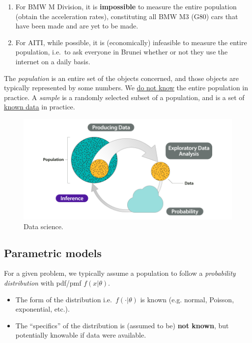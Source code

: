 \documentclass[
]{book}
\theoremstyle{definition}
\theoremstyle{definition}
\theoremstyle{definition}
\theoremstyle{definition}
\theoremstyle{remark}
\begin{document}
\begin{enumerate}
\def\labelenumi{\arabic{enumi}.}
\item
  For BMW M Division, it is \textbf{impossible} to measure the entire population (obtain the acceleration rates), constituting all BMW M3 (G80) cars that have been made and are yet to be made.
\item
  For AITI, while possible, it is (economically) infeasible to measure the entire population, i.e.~to ask everyone in Brunei whether or not they use the internet on a daily basis.
\end{enumerate}

The \emph{population} is an entire set of the objects concerned, and those objects are typically represented by some numbers. We \uline{do not know} the entire population in practice.
A \emph{sample} is a randomly selected subset of a population, and is a set of \uline{known data} in practice.

\begin{figure}

{\centering \includegraphics[width=0.6\linewidth]{figure/00-popsample} 

}

\caption{Data science.}\label{fig:popsample}
\end{figure}

\hypertarget{parametric-models}{%
\subsection*{Parametric models}\label{parametric-models}}

For a given problem, we typically assume a population
to follow a \emph{probability distribution} with pdf/pmf \(f(x|\theta)\).

\begin{itemize}
\item
  The form of the distribution i.e.~\(f(\cdot|\theta)\) is known (e.g.
  normal, Poisson, exponential, etc.).
\item
  The ``specifics'' of the distribution is (assumed to be) \textbf{not
  known}, but potentially knowable if data were available.
\end{itemize}
\end{document}

